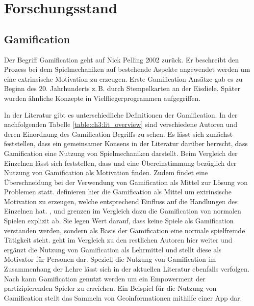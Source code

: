 \chapter{Forschungsstand}
\label{ch3:Forschungsstand}

\section{Gamification}
\label{ch3:s:Gamification}

Der Begriff Gamification geht auf Nick Pelling 2002 zurück.\cite{Pelling.2011}
Er beschreibt den Prozess bei dem Spielmechaniken auf bestehende Aspekte angewendet werden um eine extrinsische Motivation zu erzeugen.\cite{Marczewski.2013}
Erste Gamification Ansätze gab es zu Beginn des 20. Jahrhunderts z.\,B. durch Stempelkarten an der Eisdiele. Später wurden ähnliche Konzepte in Vielfliegerprogrammen aufgegriffen.

In der Literatur gibt es unterschiedliche Definitionen der Gamification.
In der nachfolgenden Tabelle \ref{table:ch3:lit_overview} sind verschiedene Autoren und deren Einordnung des Gamification Begriffs zu sehen.
Es lässt sich zunächst feststellen, dass ein gemeinsamer Konsens in der Literatur darüber herrscht, dass Gamification eine Nutzung von Spielmechaniken darstellt.
Beim Vergleich der Einzelnen lässt sich feststellen, dass \textcite{Zichermann.2011} und \textcite{Kapp.2012} eine Übereinstimmung bezüglich der Nutzung von Gamification als Motivation finden. Zudem findet eine Überschneidung bei der Verwendung von Gamification als Mittel zur Lösung von Problemen statt. \textcite{Zichermann.2011} definieren hier die Gamification als Mittel um extrinsische Motivation zu erzeugen, welche entsprechend Einfluss auf die Handlungen des Einzelnen hat.
\textcite{Deterding.2011}, \textcite{Breuer.2011} und \textcite{Oxford.2013} grenzen im Vergleich dazu die Gamification von normalen Spielen explizit ab. Sie legen Wert darauf, dass keine Spiele als Gamification verstanden werden, sondern als Basis der Gamification eine normale spielfremde Tätigkeit steht.
\textcite{Kapp.2012} geht im Vergleich zu den restlichen Autoren hier weiter und ergänzt die Nutzung von Gamification als Lehrmittel und stellt diese als Motivator für Personen dar. Speziell die Nutzung von Gamification im Zusammenhang der Lehre lässt sich in der aktuellen Literatur ebenfalls verfolgen.\cite{Loh.2012}
Nach \textcite{Jeannerod.2003} kann Gamification genutzt werden um ein Empowerment der partizipierenden Spieler zu erreichen.
Ein Beispiel für die Nutzung von Gamification stellt das Sammeln von Geoinformationen mithilfe einer App dar.\citep{Odobasic.2013}

